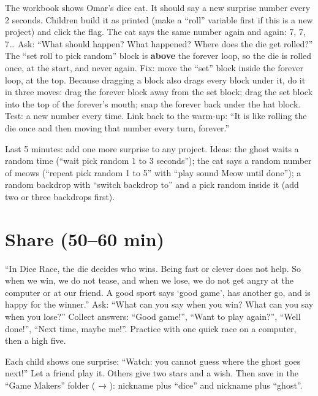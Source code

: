 \begin{bughunt}
The workbook shows Omar's dice cat. It should say a new surprise number every 2 seconds. Children build it as printed (make a \enquote{roll} variable first if this is a new project) and click the flag. The cat says the same number again and again: 7, 7, 7\ldots{} Ask: \enquote{What should happen? What happened? Where does the die get rolled?} The \enquote{set roll to pick random} block is \textbf{above} the forever loop, so the die is rolled once, at the start, and never again. Fix: move the \enquote{set} block inside the forever loop, at the top. Because dragging a block also drags every block under it, do it in three moves: drag the forever block away from the set block; drag the set block into the top of the forever's mouth; snap the forever back under the hat block. Test: a new number every time. Link back to the warm-up: \enquote{It is like rolling the die once and then moving that number every turn, forever.}
\end{bughunt}

\begin{freebuild}
Last 5 minutes: add one more surprise to any project. Ideas: the ghost waits a random time (\enquote{wait pick random 1 to 3 seconds}); the cat says a random number of meows (\enquote{repeat pick random 1 to 5} with \enquote{play sound Meow until done}); a random backdrop with \enquote{switch backdrop to} and a pick random inside it (add two or three backdrops first).
\end{freebuild}

\section{Share (50--60 min)}
\begin{safety}
\enquote{In Dice Race, the die decides who wins. Being fast or clever does not help. So when we win, we do not tease, and when we lose, we do not get angry at the computer or at our friend. A good sport says \enquote{good game}, has another go, and is happy for the winner.} Ask: \enquote{What can you say when you win? What can you say when you lose?} Collect answers: \enquote{Good game!}, \enquote{Want to play again?}, \enquote{Well done!}, \enquote{Next time, maybe me!}. Practice with one quick race on a computer, then a high five.
\end{safety}

\begin{teacherscript}
Each child shows one surprise: \enquote{Watch: you cannot guess where the ghost goes next!} Let a friend play it. Others give two stars and a wish. Then save in the \enquote{Game Makers} folder ( → ): nickname plus \enquote{dice} and nickname plus \enquote{ghost}.
\end{teacherscript}

